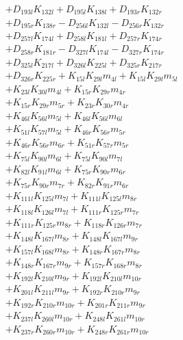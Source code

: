 \begin{multicols}{2}
\begin{align}
&+ D_{193l}K_{132l} + D_{195l}K_{138l} + D_{193r}K_{132r}  \nonumber \\
&+ D_{195r}K_{138r} - D_{256l}K_{132l} - D_{256r}K_{132r}  \nonumber \\
&+ D_{257l}K_{174l} + D_{258l}K_{181l} + D_{257r}K_{174r}  \nonumber \\
&+ D_{258r}K_{181r} - D_{327l}K_{174l} - D_{327r}K_{174r}  \nonumber \\
&+ D_{325l}K_{217l} + D_{326l}K_{225l} + D_{325r}K_{217r}  \nonumber \\
&+ D_{326r}K_{225r} + K_{15l}K_{29l}m_{4l} + K_{15l}K_{29l}m_{5l}  \nonumber \\
&+ K_{23l}K_{30l}m_{4l} + K_{15r}K_{29r}m_{4r}  \nonumber \\
&+ K_{15r}K_{29r}m_{5r} + K_{23r}K_{30r}m_{4r}  \nonumber \\
&+ K_{46l}K_{56l}m_{5l} + K_{46l}K_{56l}m_{6l}  \nonumber \\
&+ K_{51l}K_{57l}m_{5l} + K_{46r}K_{56r}m_{5r}  \nonumber \\
&+ K_{46r}K_{56r}m_{6r} + K_{51r}K_{57r}m_{5r}  \nonumber \\
&+ K_{75l}K_{90l}m_{6l} + K_{75l}K_{90l}m_{7l}  \nonumber \\
&+ K_{82l}K_{91l}m_{6l} + K_{75r}K_{90r}m_{6r}  \nonumber \\
&+ K_{75r}K_{90r}m_{7r} + K_{82r}K_{91r}m_{6r}  \nonumber \\
&+ K_{111l}K_{125l}m_{7l} + K_{111l}K_{125l}m_{8r}  \nonumber \\
&+ K_{118l}K_{126l}m_{7l} + K_{111r}K_{125r}m_{7r}  \nonumber \\
&+ K_{111r}K_{125r}m_{8r} + K_{118r}K_{126r}m_{7r}  \nonumber \\
&+ K_{148l}K_{167l}m_{8r} + K_{148l}K_{167l}m_{9r}  \nonumber \\
&+ K_{157l}K_{168l}m_{8r} + K_{148r}K_{167r}m_{8r}  \nonumber \\
&+ K_{148r}K_{167r}m_{9r} + K_{157r}K_{168r}m_{8r}  \nonumber \\
&+ K_{192l}K_{210l}m_{9r} + K_{192l}K_{210l}m_{10r}  \nonumber \\
&+ K_{201l}K_{211l}m_{9r} + K_{192r}K_{210r}m_{9r}  \nonumber \\
&+ K_{192r}K_{210r}m_{10r} + K_{201r}K_{211r}m_{9r}  \nonumber \\
&+ K_{237l}K_{260l}m_{10r} + K_{248l}K_{261l}m_{10r}  \nonumber \\
&+ K_{237r}K_{260r}m_{10r} + K_{248r}K_{261r}m_{10r} \nonumber \\

\end{align}
\end{multicols}
